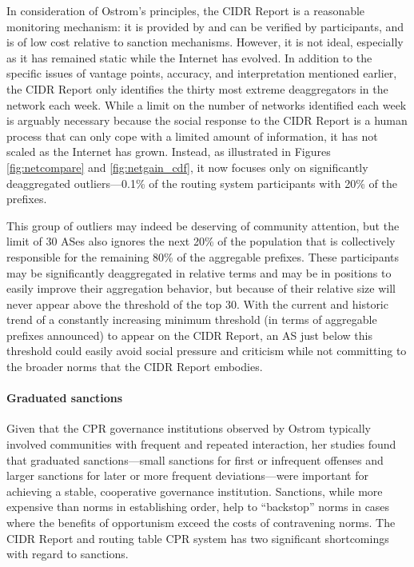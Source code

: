 In consideration of Ostrom's principles, the CIDR Report is a reasonable
monitoring mechanism: it is provided by and can be verified by participants,
and is of low cost relative to sanction mechanisms. However, it is not ideal,
especially as it has remained static while the Internet has evolved.  In
addition to the specific issues of vantage points, accuracy, and interpretation
mentioned earlier, the CIDR Report only identifies the thirty most extreme
deaggregators in the network each week. While a limit on the number of networks
identified each week is arguably necessary because the social response to the
CIDR Report is a human process that can only cope with a limited amount of
information, it has not scaled as the Internet has grown. Instead, as
illustrated in Figures \ref{fig:netcompare} and \ref{fig:netgain_cdf}, it now
focuses only on significantly deaggregated outliers---0.1\% of the routing
system participants with 20\% of the prefixes.

This group of outliers may indeed be deserving of community attention, but the
limit of 30 ASes also ignores the next 20\% of the population that is
collectively responsible for the remaining 80\% of the aggregable prefixes.
These participants may be significantly deaggregated in relative terms and may
be in positions to easily improve their aggregation behavior, but because of
their relative size will never appear above the threshold of the top 30. With
the current and historic trend of a constantly increasing minimum threshold (in
terms of aggregable prefixes announced) to appear on the CIDR Report, an AS
just below this threshold could easily avoid social pressure and criticism
while not committing to the broader norms that the CIDR Report embodies.

\paragraph{Graduated sanctions}

Given that the CPR governance institutions observed by Ostrom typically
involved communities with frequent and repeated interaction, her studies found
that graduated sanctions---small sanctions for first or infrequent offenses and
larger sanctions for later or more frequent deviations---were important for
achieving a stable, cooperative governance institution. Sanctions, while
more expensive than norms in establishing order, help to ``backstop'' norms in
cases where the benefits of opportunism exceed the costs of contravening norms.
The CIDR Report and routing table CPR system has two significant shortcomings
with regard to sanctions.

